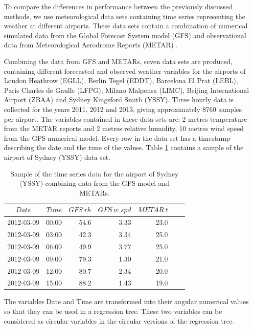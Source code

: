\documentclass[times,twocolumn,final,authoryear]{elsarticle}
\begin{document}
To compare the differences in performance between the previously discussed methods, we use meteorological data sets containing time series representing the weather at different airports. These data sets contain a combination of numerical simulated data from the Global Forecast System model (GFS) \citep{CampanaCaplan2005} and observational data from Meteorological Aerodrome Reports (METAR) \citep{WMO1995}.

Combining the data from GFS and METARs, seven data sets are produced, containing different forecasted and observed weather variables for the airports of London Heathrow (EGLL), Berlin Tegel (EDDT), Barcelona El Prat (LEBL), Paris Charles de Gaulle (LFPG), Milano Malpensa (LIMC), Beijing International Airport (ZBAA) and Sydney Kingsford Smith (YSSY). Three hourly data is collected for the years 2011, 2012 and 2013, giving approximately 8760 samples per airport. The variables contained in these data sets are: 2 metres temperature from the METAR reports and 2 metres relative humidity, 10 metres wind speed from the GFS numerical model. Every row in the data set has a timestamp describing the date and the time of the values. Table \ref{t2} contains a sample of the airport of Sydney (YSSY) data set.

\begin{table}[t]
\caption{Sample of the time series data for the airport of Sydney (YSSY) combining data from the GFS model and METARs.}\label{t2}
\begin{center}
\begin{tabular}{crrrrrr}
\hline\hline
$Date$ & $Time$ & $GFS\ rh$ & $GFS\ w\_spd$ & $METAR\ t$\\
\hline
2012-03-09 & 00:00 & 54.6 & 3.33 & 23.0\\
2012-03-09 & 03:00 & 42.3 & 3.34 & 25.0\\
2012-03-09 & 06:00 & 49.9 & 3.77 & 25.0\\
2012-03-09 & 09:00 & 79.3 & 1.30 & 21.0\\
2012-03-09 & 12:00 & 80.7 & 2.34 & 20.0\\
2012-03-09 & 15:00 & 88.2 & 1.43 & 19.0\\
\hline
\end{tabular}
\end{center}
\end{table}

The variables Date and Time are transformed into their angular numerical values so that they can be used in a regression tree. These two variables can be considered as circular variables in the circular versions of the regression tree.
\end{document}

